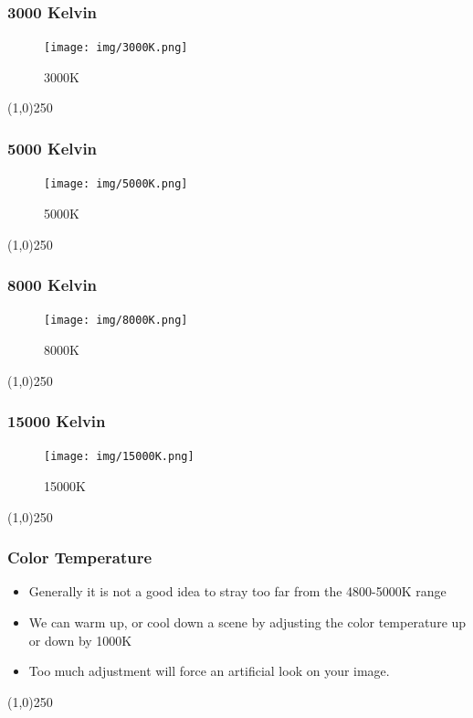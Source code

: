 \begin{frame}
\frametitle{3000 Kelvin}
\begin{figure}
	\centering
		\texttt{[image: img/3000K.png]}
	\caption{3000K}
	\label{fig:colortemp3000}
\end{figure}
\end{frame}
\begin{center}\line(1,0){250}\end{center}


\begin{frame}
\frametitle{5000 Kelvin}
\begin{figure}
	\centering
		\texttt{[image: img/5000K.png]}
	\caption{5000K}
	\label{fig:colortemp5000}
\end{figure}
\end{frame}
\begin{center}\line(1,0){250}\end{center}

\begin{frame}
\frametitle{8000 Kelvin}
\begin{figure}
	\centering
		\texttt{[image: img/8000K.png]}
	\caption{8000K}
	\label{fig:colortemp8000}
\end{figure}
\end{frame}
\begin{center}\line(1,0){250}\end{center}

\begin{frame}
\frametitle{15000 Kelvin}
\begin{figure}
	\centering
		\texttt{[image: img/15000K.png]}
	\caption{15000K}
	\label{fig:colortemp15000}
\end{figure}
\end{frame}
\begin{center}\line(1,0){250}\end{center}

\begin{frame}
\frametitle{Color Temperature}
\begin{itemize}
	\item Generally it is not a good idea to stray too far from the 4800-5000K range
	\item We can warm up, or cool down a scene by adjusting the color temperature up or down by 1000K
	\item Too much adjustment will force an artificial look on your image.
\end{itemize}
\end{frame}
\begin{center}\line(1,0){250}\end{center}






